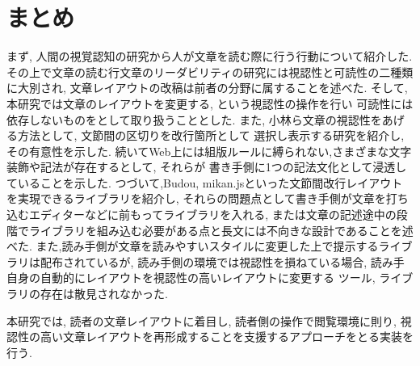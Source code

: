\section{まとめ}
まず, 人間の視覚認知の研究から人が文章を読む際に行う行動について紹介した.
その上で文章の読む行文章のリーダビリティの研究には視認性と可読性の二種類に大別され, 
文章レイアウトの改稿は前者の分野に属することを述べた.
そして, 本研究では文章のレイアウトを変更する, という視認性の操作を行い
可読性には依存しないものをとして取り扱うこととした.
また, 小林ら文章の視認性をあげる方法として, 文節間の区切りを改行箇所として
選択し表示する研究を紹介し, その有意性を示した.
続いてWeb上には組版ルールに縛られない,さまざまな文字装飾や記法が存在するとして, それらが
書き手側に1つの記法文化として浸透していることを示した.
つづいて,Budou, mikan.jsといった文節間改行レイアウトを実現できるライブラリを紹介し, 
それらの問題点として書き手側が文章を打ち込むエディターなどに前もってライブラリを入れる, 
または文章の記述途中の段階でライブラリを組み込む必要がある点と長文には不向きな設計であることを述べた.
また,読み手側が文章を読みやすいスタイルに変更した上で提示するライブラリは配布されているが,
読み手側の環境では視認性を損ねている場合, 読み手自身の自動的にレイアウトを視認性の高いレイアウトに変更する
ツール, ライブラリの存在は散見されなかった.

本研究では, 読者の文章レイアウトに着目し, 読者側の操作で閲覧環境に則り,
視認性の高い文章レイアウトを再形成することを支援するアプローチをとる実装を行う.